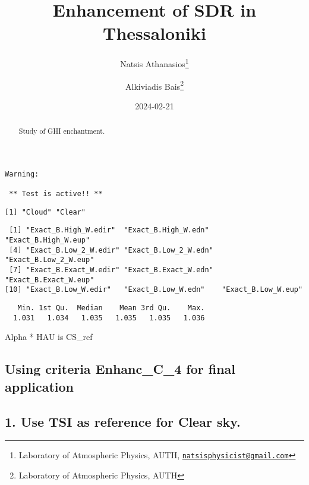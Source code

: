 \documentclass[
  10pt,
  a4paper,oneside]{article}
\title{Enhancement of SDR in Thessaloniki}
\author{Natsis Athanasios\footnote{Laboratory of Atmospheric Physics, AUTH, \href{mailto:natsisphysicist@gmail.com}{\nolinkurl{natsisphysicist@gmail.com}}} \and Alkiviadis Bais\footnote{Laboratory of Atmospheric Physics, AUTH}}
\date{2024-02-21}
\begin{document}
\maketitle
\begin{abstract}
Study of GHI enchantment.
\end{abstract}

{
\hypersetup{linkcolor=}
\setcounter{tocdepth}{4}
\tableofcontents
}
\begin{verbatim}
Warning: 

 ** Test is active!! ** 
\end{verbatim}

\begin{verbatim}
[1] "Cloud" "Clear"
\end{verbatim}

\begin{verbatim}
 [1] "Exact_B.High_W.edir"  "Exact_B.High_W.edn"   "Exact_B.High_W.eup"  
 [4] "Exact_B.Low_2_W.edir" "Exact_B.Low_2_W.edn"  "Exact_B.Low_2_W.eup" 
 [7] "Exact_B.Exact_W.edir" "Exact_B.Exact_W.edn"  "Exact_B.Exact_W.eup" 
[10] "Exact_B.Low_W.edir"   "Exact_B.Low_W.edn"    "Exact_B.Low_W.eup"   
\end{verbatim}

\begin{verbatim}
   Min. 1st Qu.  Median    Mean 3rd Qu.    Max. 
  1.031   1.034   1.035   1.035   1.035   1.036 
\end{verbatim}

Alpha * HAU is CS\_ref

\hypertarget{using-criteria-enhanc_c_4-for-final-application}{%
\subsection{\texorpdfstring{Using criteria \textbf{Enhanc\_C\_4} for final application}{Using criteria Enhanc\_C\_4 for final application}}\label{using-criteria-enhanc_c_4-for-final-application}}

\hypertarget{use-tsi-as-reference-for-clear-sky.}{%
\subsection{1. Use TSI as reference for Clear sky.}\label{use-tsi-as-reference-for-clear-sky.}}
\end{document}
